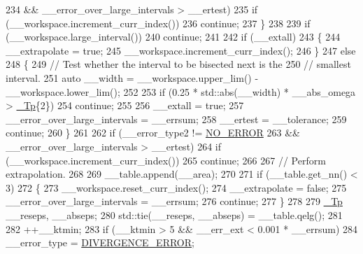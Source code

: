 \begin{DoxyCode}
234                  && \_\_error\_over\_large\_intervals > \_\_ertest)
235                   \textcolor{keywordflow}{if} (\_\_workspace.increment\_curr\_index())
236                     \textcolor{keywordflow}{continue};
237             \}
238 
239           \textcolor{keywordflow}{if} (\_\_workspace.large\_interval())
240             \textcolor{keywordflow}{continue};
241 
242           \textcolor{keywordflow}{if} (\_\_extall)
243             \{
244               \_\_extrapolate = \textcolor{keyword}{true};
245               \_\_workspace.increment\_curr\_index();
246             \}
247           \textcolor{keywordflow}{else}
248             \{
249               \textcolor{comment}{// Test whether the interval to be bisected next is the}
250               \textcolor{comment}{// smallest interval.}
251               \textcolor{keyword}{auto} \_\_width = \_\_workspace.upper\_lim() - \_\_workspace.lower\_lim();
252 
253               \textcolor{keywordflow}{if} (0.25 * std::abs(\_\_width) * \_\_abs\_omega > \hyperlink{namespace____gnu__cxx_a3b19a9c800ca194374ef9172290f7d79}{\_Tp}\{2\})
254                 \textcolor{keywordflow}{continue};
255 
256               \_\_extall = \textcolor{keyword}{true};
257               \_\_error\_over\_large\_intervals = \_\_errsum;
258               \_\_ertest = \_\_tolerance;
259               \textcolor{keywordflow}{continue};
260             \}
261 
262           \textcolor{keywordflow}{if} (\_\_error\_type2 != \hyperlink{namespace____gnu__cxx_ad6c62dd86a596716cece6ac2d4cfd4b3ac31eecc280b10dec2efb4a2216ccc2e0}{NO\_ERROR}
263            && \_\_error\_over\_large\_intervals > \_\_ertest)
264             \textcolor{keywordflow}{if} (\_\_workspace.increment\_curr\_index())
265               \textcolor{keywordflow}{continue};
266 
267           \textcolor{comment}{// Perform extrapolation.}
268 
269           \_\_table.append(\_\_area);
270 
271           \textcolor{keywordflow}{if} (\_\_table.get\_nn() < 3)
272             \{
273               \_\_workspace.reset\_curr\_index();
274               \_\_extrapolate = \textcolor{keyword}{false};
275               \_\_error\_over\_large\_intervals = \_\_errsum;
276               \textcolor{keywordflow}{continue};
277             \}
278 
279           \hyperlink{namespace____gnu__cxx_a3b19a9c800ca194374ef9172290f7d79}{\_Tp} \_\_reseps, \_\_abseps;
280           std::tie(\_\_reseps, \_\_abseps) = \_\_table.qelg();
281 
282           ++\_\_ktmin;
283           \textcolor{keywordflow}{if} (\_\_ktmin > 5 && \_\_err\_ext < 0.001 * \_\_errsum)
284             \_\_error\_type = \hyperlink{namespace____gnu__cxx_ad6c62dd86a596716cece6ac2d4cfd4b3a5a36b63b8fa7c921d9332c69416c2686}{DIVERGENCE\_ERROR};

\end{DoxyCode}
